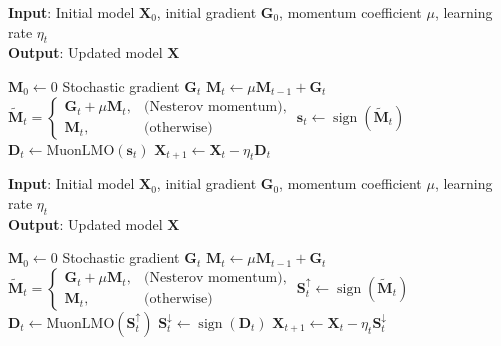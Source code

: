\documentclass[letterpaper]{article} %
\begin{document}
\begin{algorithm}[!h]
    \caption{MuonUSign}
    \label{alg:muon_usign}
    \textbf{Input}: Initial model $\mathbf{X}_0$, initial gradient $\mathbf{G}_0$, momentum coefficient $\mu$, learning rate $\eta_t$ \\
    \textbf{Output}: Updated model $\mathbf{X}$ 
    \begin{algorithmic}[1]
    \State $\mathbf{M}_0 \gets 0$ 
        \State Stochastic gradient $\mathbf{G}_t$
        \State $\mathbf{M}_t \gets \mu \mathbf{M}_{t-1} + \mathbf{G}_t$ 
        \State $\tilde{\mathbf{M}}_t =
        \begin{cases} 
            \mathbf{G}_t + \mu \mathbf{M}_t, & \text{(Nesterov momentum)}, \\
            \mathbf{M}_t, & \text{(otherwise)}
        \end{cases}$
        \State $\mathbf{s}_t \gets \operatorname{sign}(\tilde{\mathbf{M}}_t)$ 
        \State $\mathbf{D}_t \gets \mathrm{MuonLMO}(\mathbf{s}_t)$
        \State $\mathbf{X}_{t+1} \gets \mathbf{X}_t - \eta_t \mathbf{D}_t$ 
    \EndFor
    \end{algorithmic}
    \end{algorithm}

    \begin{algorithm}[!h]
        \caption{MuonUDSign}
        \label{alg:muon_udsign}
        \textbf{Input}: Initial model $\mathbf{X}_0$, initial gradient $\mathbf{G}_0$, momentum coefficient $\mu$, learning rate $\eta_t$ \\
        \textbf{Output}: Updated model $\mathbf{X}$ 
        \begin{algorithmic}[1]
        \State $\mathbf{M}_0 \gets 0$ 
            \State Stochastic gradient $\mathbf{G}_t$
            \State $\mathbf{M}_t \gets \mu \mathbf{M}_{t-1} + \mathbf{G}_t$ 
            \State $\tilde{\mathbf{M}}_t =
            \begin{cases} 
                \mathbf{G}_t + \mu \mathbf{M}_t, & \text{(Nesterov momentum)}, \\
                \mathbf{M}_t, & \text{(otherwise)}
            \end{cases}$
            \State $\mathbf{S}_t^{\uparrow} \gets \operatorname{sign}(\tilde{\mathbf{M}}_t)$ 
            \State $\mathbf{D}_t \gets \mathrm{MuonLMO}(\mathbf{S}_t^{\uparrow})$
            \State $\mathbf{S}_t^{\downarrow} \gets \operatorname{sign}(\mathbf{D}_t)$ 
            \State $\mathbf{X}_{t+1} \gets \mathbf{X}_t - \eta_t \mathbf{S}_t^{\downarrow}$ 
        \EndFor
        \end{algorithmic}
\end{algorithm}
    
\end{document}
